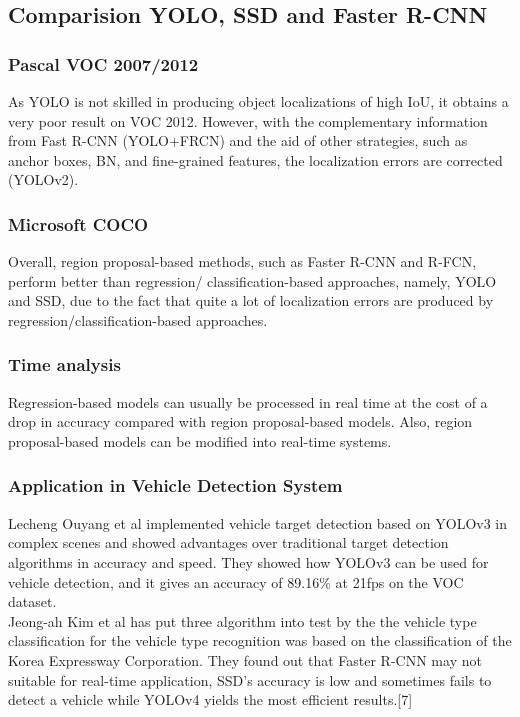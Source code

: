     \subsection{Comparision YOLO, SSD and Faster R-CNN}
        \subsubsection{Pascal VOC 2007/2012}
            As YOLO is not skilled in producing object localizations of high IoU, it obtains a very poor result on VOC 2012. However, with the complementary information from Fast R-CNN (YOLO+FRCN) and the aid of other strategies, such as anchor boxes, BN, and fine-grained features, the localization errors are corrected (YOLOv2). 
        \subsubsection{Microsoft COCO}
            Overall, region proposal-based methods, such as Faster R-CNN and R-FCN, perform better than regression/ classification-based approaches, namely, YOLO and SSD, due to the fact that quite a lot of localization errors are produced by regression/classification-based approaches.
        \subsubsection{Time analysis}
            Regression-based models can usually be processed in real time at the cost of a drop in accuracy compared with region proposal-based models. Also, region proposal-based models can be modified into real-time systems.
        \subsubsection{Application in Vehicle Detection System}
            Lecheng Ouyang et al implemented vehicle target detection based on YOLOv3 in complex scenes and showed advantages over traditional target detection algorithms in accuracy and speed. They showed how YOLOv3 can be used for vehicle detection, and it gives an accuracy of 89.16\% at 21fps on the VOC dataset. \\ 
            \vspace{3mm}
            Jeong-ah Kim et al has put three algorithm into test by the the vehicle type classification for the vehicle type recognition was based on the classification of the Korea Expressway Corporation. They found out that Faster R-CNN may not suitable for real-time application, SSD's accuracy is low and sometimes fails to detect a vehicle while YOLOv4 yields the most efficient results.[7] \\ 
